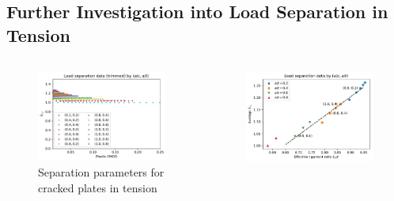 \subsection{Further Investigation into Load Separation in Tension}

\begin{frame}
\begin{columns}
\begin{column}{0.45\textwidth}
\begin{figure}[tbp]
\centering
\includegraphics[width=\columnwidth]{cmodpl_Sij_tension_14}
\caption{Separation parameters for cracked plates in tension}
\end{figure}
\end{column}
\begin{column}{0.45\textwidth}
\begin{figure}[tbp]
\centering
\includegraphics[width=\columnwidth]{bet_Sij_tension_14_annotated}

\end{figure}
\end{column}
\end{columns}
\end{frame}
